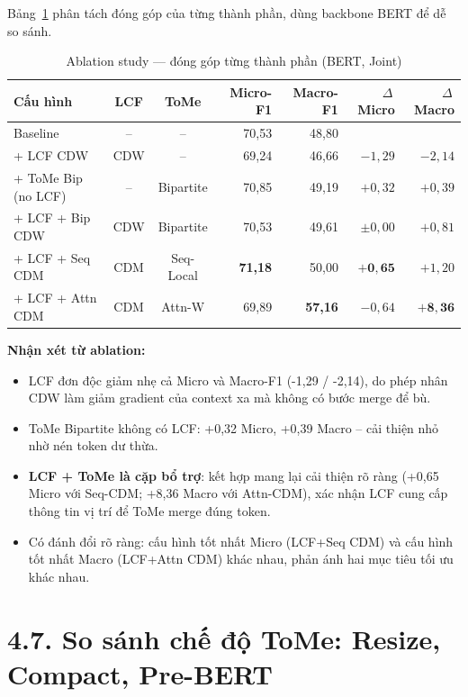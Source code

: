Bảng~\ref{tab:ablation} phân tách đóng góp của từng thành phần,
dùng backbone BERT để dễ so sánh.

\begin{table}[H]
\centering
\small
\caption{Ablation study — đóng góp từng thành phần (BERT, Joint)}
\label{tab:ablation}
\begin{tabular}{@{}lccrrrr@{}}
\toprule
\textbf{Cấu hình} & \textbf{LCF} & \textbf{ToMe}
  & \textbf{Micro-F1} & \textbf{Macro-F1} & $\Delta$\,Micro & $\Delta$\,Macro \\
\midrule
Baseline             & --  & --        & 70,53 & 48,80 &       &       \\
+ LCF CDW            & CDW & --        & 69,24 & 46,66 & $-1,29$ & $-2,14$ \\
+ ToMe Bip (no LCF)  & --  & Bipartite & 70,85 & 49,19 & $+0,32$ & $+0,39$ \\
\midrule
+ LCF + Bip CDW      & CDW & Bipartite & 70,53 & 49,61 & $\pm0,00$ & $+0,81$ \\
+ LCF + Seq CDM      & CDM & Seq-Local & \textbf{71,18} & 50,00 & $\mathbf{+0,65}$ & $+1,20$ \\
+ LCF + Attn CDM     & CDM & Attn-W    & 69,89 & \textbf{57,16} & $-0,64$ & $\mathbf{+8,36}$ \\
\bottomrule
\end{tabular}
\end{table}

\textbf{Nhận xét từ ablation:}
\begin{itemize}
  \item LCF đơn độc giảm nhẹ cả Micro và Macro-F1 (-1,29 / -2,14),
        do phép nhân CDW làm giảm gradient của context xa mà không có
        bước merge để bù.
  \item ToMe Bipartite không có LCF: +0,32 Micro, +0,39 Macro -- cải
        thiện nhỏ nhờ nén token dư thừa.
  \item \textbf{LCF + ToMe là cặp bổ trợ}: kết hợp mang lại cải thiện
        rõ ràng (+0,65 Micro với Seq-CDM; +8,36 Macro với Attn-CDM),
        xác nhận LCF cung cấp thông tin vị trí để ToMe merge đúng token.
  \item Có đánh đổi rõ ràng: cấu hình tốt nhất Micro (LCF+Seq CDM)
        và cấu hình tốt nhất Macro (LCF+Attn CDM) khác nhau, phản ánh
        hai mục tiêu tối ưu khác nhau.
\end{itemize}

\section{4.7.\; So sánh chế độ ToMe: Resize, Compact, Pre-BERT}
\label{sec:resize_compact}

